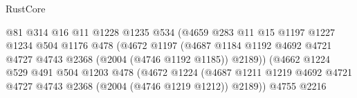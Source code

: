 \begin{lexlean}{RustCore}
\begin{coremodule}
                                          @81
                                          @314
                                          @16
                                          @11
                                          @1228
                                          @1235
                                          @534
                                          (@4659
                                            @283
                                            @11
                                            @15
                                            @1197
                                            @1227
                                            @1234
                                            @504
                                            @1176
                                            @478
                                            (@4672
                                              @1197
                                              (@4687
                                                @1184
                                                @1192
                                                @4692
                                                @4721
                                                @4727
                                                @4743
                                                @2368
                                                (@2004 (@4746 @1192 @1185))
                                                @2189))
                                            (@4662
                                              @1224
                                              @529
                                              @491
                                              @504
                                              @1203
                                              @478
                                              (@4672
                                                @1224
                                                (@4687
                                                  @1211
                                                  @1219
                                                  @4692
                                                  @4721
                                                  @4727
                                                  @4743
                                                  @2368
                                                  (@2004 (@4746 @1219 @1212))
                                                  @2189))
                                              @4755
                                              @2216

\end{coremodule}
\end{lexlean}
